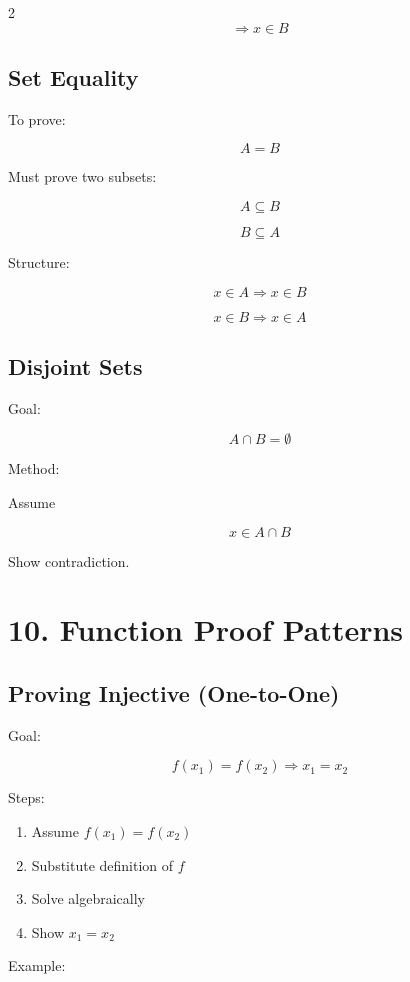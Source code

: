 \documentclass[10pt]{article}
\begin{document}
\begin{multicols}{2}
\[
\Rightarrow x \in B
\]

\subsection*{Set Equality}

To prove:

\[
A = B
\]

Must prove two subsets:

\[
A \subseteq B
\]

\[
B \subseteq A
\]

Structure:

\[
x \in A \Rightarrow x \in B
\]

\[
x \in B \Rightarrow x \in A
\]

\subsection*{Disjoint Sets}

Goal:

\[
A \cap B = \emptyset
\]

Method:

Assume

\[
x \in A \cap B
\]

Show contradiction.

\section*{10. Function Proof Patterns}

\subsection*{Proving Injective (One-to-One)}

Goal:

\[
f(x_1)=f(x_2) \Rightarrow x_1=x_2
\]

Steps:

\begin{enumerate}
\item Assume $f(x_1)=f(x_2)$
\item Substitute definition of $f$
\item Solve algebraically
\item Show $x_1=x_2$
\end{enumerate}

Example:


\end{multicols}
\end{document}
